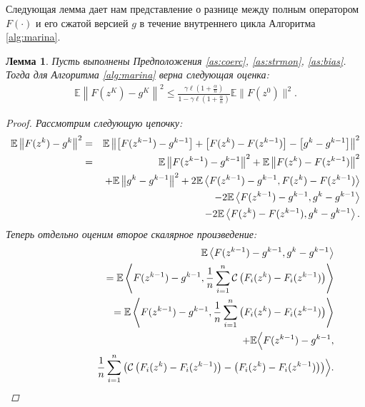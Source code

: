 \documentclass{ProcISPRAS}
\newtheorem{lemma}{Лемма}
\begin{document}
Следующая лемма дает нам представление о разнице между полным оператором $F(\cdot)$ и его сжатой версией $g$ в течение внутреннего цикла Алгоритма \ref{alg:marina}. 

\begin{lemma} \label{lem:2}
Пусть выполнены Предположения \ref{as:coerc}, \ref{as:strmon}, \ref{as:bias}. Тогда для Алгоритма \ref{alg:marina} верна следующая оценка:
\begin{eqnarray*}
    \mathbb E \left\|F(z^K) - g^{K}\right\|^2 \leqslant \frac{\gamma\ell\left(1+\frac{\alpha}{n}\right)}{1 - \gamma\ell\left(1+\frac{\alpha}{n}\right)} \mathbb E\|F(z^0)\|^2.
\end{eqnarray*}
\begin{proof}
Рассмотрим следующую цепочку:
\begin{eqnarray}
    \notag\mathbb E \left\|F(z^k) - g^k\right\|^2 &=& \mathbb E \left\|\left[F(z^{k-1}) - g^{k-1}\right] + \left[F(z^k) - F(z^{k-1})\right] - \left[g^k - g^{k-1}\right]\right\|^2\\
    \notag&=& \mathbb E \left\|F(z^{k-1}) - g^{k-1}\right\|^2 + \mathbb E \left\|F(z^k) - F(z^{k-1})\right\|^2 \\
    \notag& & + \mathbb E \left\|g^k - g^{k-1}\right\|^2 + 2\mathbb E\left\langle F(z^{k-1}) - g^{k-1}, F(z^k) - F(z^{k-1})\right\rangle \\
    \notag& & - 2\mathbb E\left\langle F(z^{k-1}) - g^{k-1}, g^k - g^{k-1}\right\rangle \\
    \label{l2:eq1}& & - 2\mathbb E\left\langle F(z^k) - F(z^{k-1}), g^k - g^{k-1}\right\rangle.
\end{eqnarray}
Теперь отдельно оценим второе скалярное произведение:
\begin{eqnarray*}
    & &\mathbb E\left\langle F(z^{k-1}) - g^{k-1}, g^k - g^{k-1}\right\rangle \\
    & & \quad\quad= \mathbb E\left\langle F(z^{k-1}) - g^{k-1}, \frac{1}{n}\sum\limits_{i=1}^n\mathcal{C}\left(F_i(z^k) - F_i(z^{k-1})\right)\right\rangle\\
    & & \quad\quad= \mathbb E\left\langle F(z^{k-1}) - g^{k-1}, \frac{1}{n}\sum\limits_{i=1}^n \left(F_i(z^k) - F_i(z^{k-1})\right)\right\rangle \\
    & & \quad\quad\quad+ \mathbb E\Bigl\langle F(z^{k-1}) - g^{k-1},\\
    & & \quad\quad\quad\quad\quad\frac{1}{n}\sum\limits_{i=1}^n\left(\mathcal{C}\left(F_i(z^k) - F_i(z^{k-1})\right) - \left(F_i(z^k) - F_i(z^{k-1})\right)\right)\Bigr\rangle.
\end{eqnarray*}

\end{proof}
\end{lemma}
\end{document}

